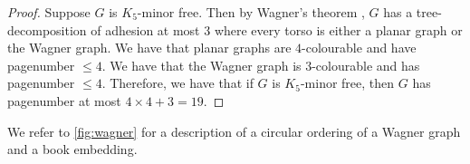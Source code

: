 \begin{proof}
	Suppose \(G\) is \(K_5\)-minor free. Then by Wagner's theorem \cite{wagnerUeberEigenschaftEbenen1937}, \(G\) has a tree-decomposition of adhesion at most 3 where every torso is either a planar graph or the Wagner graph.
	We have that planar graphs are \(4\)-colourable and have pagenumber \(\leq 4\). We have that the Wagner graph is \(3\)-colourable and has pagenumber \(\leq 4\). Therefore, we have that if \(G\) is \(K_5\)-minor free, then \(G\) has pagenumber at most \(4 \times 4 + 3 = 19\).
\end{proof}
We refer to \cref{fig:wagner} for a description of a circular ordering of a Wagner graph and a book embedding.
